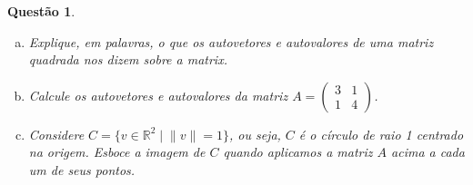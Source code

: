 \documentclass[a4paper,12pt]{article}
\def\R{\mathbb R}
\newtheorem{qst}{Questão}
\begin{document}
\begin{qst}
	\begin{enumerate}[a)]
		\item Explique, em palavras, o que os autovetores e autovalores de uma matriz quadrada nos dizem sobre a matrix.
		\item Calcule os autovetores e autovalores da matriz $A=\begin{pmatrix}
		3&1\\1&4
		\end{pmatrix}$.
		\item Considere $C=\{v\in \R^2\mid \lVert v\rVert = 1\}$, ou seja, $C$ é o círculo de raio 1 centrado na origem. Esboce a imagem de $C$ quando aplicamos a matriz $A$ acima a cada um de seus pontos.
	\end{enumerate}
\end{qst}
\end{document}
